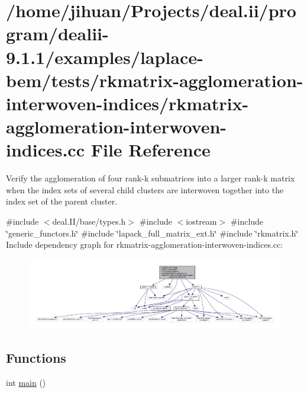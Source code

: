 \hypertarget{rkmatrix-agglomeration-interwoven-indices_8cc}{}\section{/home/jihuan/\+Projects/deal.ii/program/dealii-\/9.1.1/examples/laplace-\/bem/tests/rkmatrix-\/agglomeration-\/interwoven-\/indices/rkmatrix-\/agglomeration-\/interwoven-\/indices.cc File Reference}
\label{rkmatrix-agglomeration-interwoven-indices_8cc}


Verify the agglomeration of four rank-\/k submatrices into a larger rank-\/k matrix when the index sets of several child clusters are interwoven together into the index set of the parent cluster.  


{\ttfamily \#include $<$deal.\+I\+I/base/types.\+h$>$}\newline
{\ttfamily \#include $<$iostream$>$}\newline
{\ttfamily \#include \char`\"{}generic\+\_\+functors.\+h\char`\"{}}\newline
{\ttfamily \#include \char`\"{}lapack\+\_\+full\+\_\+matrix\+\_\+ext.\+h\char`\"{}}\newline
{\ttfamily \#include \char`\"{}rkmatrix.\+h\char`\"{}}\newline
Include dependency graph for rkmatrix-\/agglomeration-\/interwoven-\/indices.cc\+:
\nopagebreak
\begin{figure}[H]
\begin{center}
\leavevmode
\includegraphics[width=350pt]{rkmatrix-agglomeration-interwoven-indices_8cc__incl}
\end{center}
\end{figure}
\subsection*{Functions}
\begin{DoxyCompactItemize}
\item 
int \hyperlink{rkmatrix-agglomeration-interwoven-indices_8cc_ae66f6b31b5ad750f1fe042a706a4e3d4}{main} ()
\end{DoxyCompactItemize}


